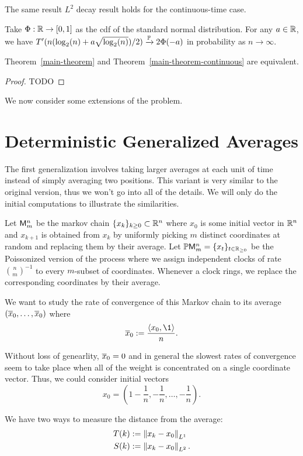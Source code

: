\documentclass[12pt]{article}
\begin{document}
The same result $L^2$ decay result holds for the continuous-time case. 

\begin{thm} \label{main-theorem-continuous}
	Take $\Phi : \mathbb{R} \to [0, 1]$ as the cdf of the standard normal distribution. For any $a \in \mathbb{R}$, we have $T'(n (\log_2(n) +a \sqrt{\log_2(n)})/2) \xrightarrow[]{\mathbb{P}} 2 \Phi(-a)$ in probability as $n \to \infty$. 
\end{thm}

\begin{prop}
	Theorem~\ref{main-theorem} and Theorem~\ref{main-theorem-continuous} are equivalent. 
\end{prop}
\begin{proof}
	TODO
\end{proof}

We now consider some extensions of the problem. 

\section{Deterministic Generalized Averages}

The first generalization involves taking larger averages at each unit of time instead of simply averaging two positions. This variant is very similar to the original version, thus we won't go into all of the details. We will only do the initial computations to illustrate the similarities. 

\begin{defn}
	Let $\mathsf{M}_m^n$ be the markov chain $\{x_k\}_{k \geq 0} \subset \mathbb{R}^n$ where $x_0$ is some initial vector in $\mathbb{R}^n$ and $x_{k+1}$ is obtained from $x_k$ by uniformly picking $m$ distinct coordinates at random and replacing them by their average. Let $\mathbb{P} \mathsf{M}_m^n = \{x_t\}_{t \in \mathbb{R}_{\geq 0}}$ be the Poissonized version of the process where we assign independent clocks of rate $\binom{n}{m}^{-1}$ to every $m$-subset of coordinates. Whenever a clock rings, we replace the corresponding coordinates by their average. 
\end{defn}

We want to study the rate of convergence of this Markov chain to its average $(\overline{x}_0, \ldots, \overline{x}_0)$ where 
\[
	\ol{x}_0 := \frac{\langle x_0, \1 \rangle}{n}.	
\]
\begin{remark}
	Without loss of genearlity, $\overline{x}_0 = 0$ and in general the slowest rates of convergence seem to take place when all of the weight is concentrated on a single coordinate vector. Thus, we could consider initial vectors 
	\[
		x_0 = \left ( 1 - \frac{1}{n}, - \frac{1}{n}, \ldots, - \frac{1}{n} \right ).
	\]	
\end{remark}
We have two ways to measure the distance from the average:
\begin{align*}
	T(k) & := \left\lVert x_k - x_0 \right\rVert_{L^1} \\
	S(k) & := \left\lVert x_k - x_0 \right\rVert_{L^2}.
\end{align*}
\end{document}
